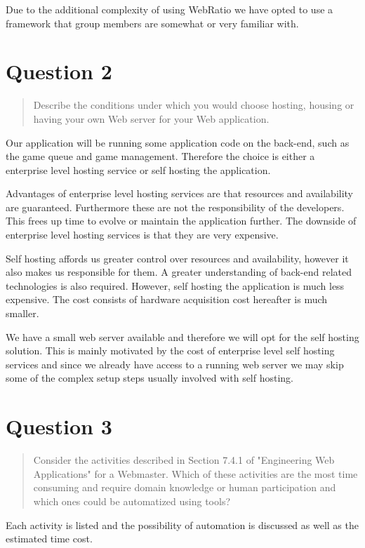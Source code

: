 \documentclass[10pt,a4paper]{report}
\begin{document}
Due to the additional complexity of using WebRatio we have opted to use a framework that group members are somewhat or very familiar with.

\section{Question 2}
\begin{quote}
Describe the conditions under which you would choose hosting, housing or having your own Web server for your Web application.
\end{quote}

Our application will be running some application code on the back-end, such as the game queue and game management. Therefore the choice is either a enterprise level hosting service or self hosting the application.

Advantages of enterprise level hosting services are that resources and availability are guaranteed. Furthermore these are not the responsibility of the developers. This frees up time to evolve or maintain the application further. The downside of enterprise level hosting services is that they are very expensive.

Self hosting affords us greater control over resources and availability, however it also makes us responsible for them. A greater understanding of back-end related technologies is also required. However, self hosting the application is much less expensive. The cost consists of hardware acquisition cost hereafter is much smaller.

We have a small web server available and therefore we will opt for the self hosting solution. This is mainly motivated by the cost of enterprise level self hosting services and since we already have access to a running web server we may skip some of the complex setup steps usually involved with self hosting.

\section{Question 3}
\begin{quote}
Consider the activities described in Section 7.4.1 of "Engineering Web Applications" for a Webmaster. Which of these activities are the most time consuming and require domain knowledge or human participation and which ones could be automatized using tools?
\end{quote}
Each activity is listed and the possibility of automation is discussed as well as the estimated time cost.
\end{document}
